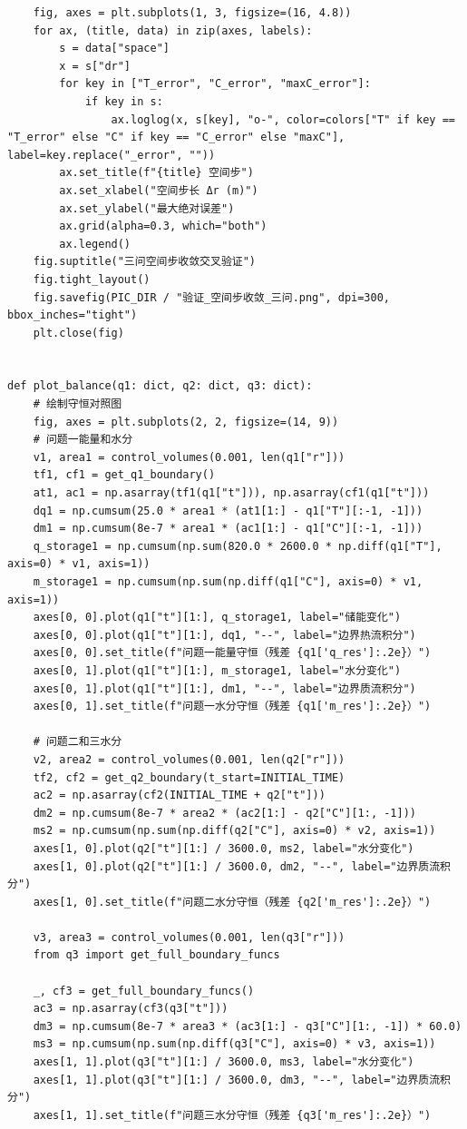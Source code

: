 \documentclass[withoutpreface,bwprint]{cumcm_thesis}
\begin{document}
\begin{appendices}
\begin{lstlisting}
    fig, axes = plt.subplots(1, 3, figsize=(16, 4.8))
    for ax, (title, data) in zip(axes, labels):
        s = data["space"]
        x = s["dr"]
        for key in ["T_error", "C_error", "maxC_error"]:
            if key in s:
                ax.loglog(x, s[key], "o-", color=colors["T" if key == "T_error" else "C" if key == "C_error" else "maxC"], label=key.replace("_error", ""))
        ax.set_title(f"{title} 空间步")
        ax.set_xlabel("空间步长 Δr (m)")
        ax.set_ylabel("最大绝对误差")
        ax.grid(alpha=0.3, which="both")
        ax.legend()
    fig.suptitle("三问空间步收敛交叉验证")
    fig.tight_layout()
    fig.savefig(PIC_DIR / "验证_空间步收敛_三问.png", dpi=300, bbox_inches="tight")
    plt.close(fig)


def plot_balance(q1: dict, q2: dict, q3: dict):
    # 绘制守恒对照图
    fig, axes = plt.subplots(2, 2, figsize=(14, 9))
    # 问题一能量和水分
    v1, area1 = control_volumes(0.001, len(q1["r"]))
    tf1, cf1 = get_q1_boundary()
    at1, ac1 = np.asarray(tf1(q1["t"])), np.asarray(cf1(q1["t"]))
    dq1 = np.cumsum(25.0 * area1 * (at1[1:] - q1["T"][:-1, -1]))
    dm1 = np.cumsum(8e-7 * area1 * (ac1[1:] - q1["C"][:-1, -1]))
    q_storage1 = np.cumsum(np.sum(820.0 * 2600.0 * np.diff(q1["T"], axis=0) * v1, axis=1))
    m_storage1 = np.cumsum(np.sum(np.diff(q1["C"], axis=0) * v1, axis=1))
    axes[0, 0].plot(q1["t"][1:], q_storage1, label="储能变化")
    axes[0, 0].plot(q1["t"][1:], dq1, "--", label="边界热流积分")
    axes[0, 0].set_title(f"问题一能量守恒（残差 {q1['q_res']:.2e}）")
    axes[0, 1].plot(q1["t"][1:], m_storage1, label="水分变化")
    axes[0, 1].plot(q1["t"][1:], dm1, "--", label="边界质流积分")
    axes[0, 1].set_title(f"问题一水分守恒（残差 {q1['m_res']:.2e}）")

    # 问题二和三水分
    v2, area2 = control_volumes(0.001, len(q2["r"]))
    tf2, cf2 = get_q2_boundary(t_start=INITIAL_TIME)
    ac2 = np.asarray(cf2(INITIAL_TIME + q2["t"]))
    dm2 = np.cumsum(8e-7 * area2 * (ac2[1:] - q2["C"][1:, -1]))
    ms2 = np.cumsum(np.sum(np.diff(q2["C"], axis=0) * v2, axis=1))
    axes[1, 0].plot(q2["t"][1:] / 3600.0, ms2, label="水分变化")
    axes[1, 0].plot(q2["t"][1:] / 3600.0, dm2, "--", label="边界质流积分")
    axes[1, 0].set_title(f"问题二水分守恒（残差 {q2['m_res']:.2e}）")

    v3, area3 = control_volumes(0.001, len(q3["r"]))
    from q3 import get_full_boundary_funcs

    _, cf3 = get_full_boundary_funcs()
    ac3 = np.asarray(cf3(q3["t"]))
    dm3 = np.cumsum(8e-7 * area3 * (ac3[1:] - q3["C"][1:, -1]) * 60.0)
    ms3 = np.cumsum(np.sum(np.diff(q3["C"], axis=0) * v3, axis=1))
    axes[1, 1].plot(q3["t"][1:] / 3600.0, ms3, label="水分变化")
    axes[1, 1].plot(q3["t"][1:] / 3600.0, dm3, "--", label="边界质流积分")
    axes[1, 1].set_title(f"问题三水分守恒（残差 {q3['m_res']:.2e}）")


\end{lstlisting}
\end{appendices}
\end{document}
